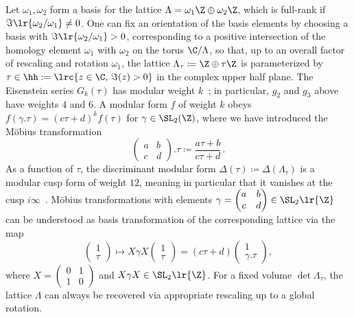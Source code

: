 \documentclass[a4paper, aps, pra, 11pt, onecolumn, tightenlines, superscriptaddress]{revtex4-2}
\begin{document}
Let $\omega_1, \omega_2$ form a basis for the lattice $\Lambda=\omega_1 \Z \oplus \omega_2\Z$, which is full-rank if $\Im\lr{\omega_2/\omega_1}\neq 0$. 
One can fix an orientation of the basis elements by choosing a basis with $\Im\lr{\omega_2/\omega_1} > 0$, corresponding to a positive intersection of the homology element $\omega_1$ with $\omega_2$ on the torus $\C /\Lambda$, so that, up to an overall factor of rescaling and rotation $\omega_1$, the lattice  $\Lambda_{\tau}\coloneqq \Z  \oplus \tau \Z$ is parameterized by $\tau \in \hh:=\lrc{ z\in\C,\, \Im(z)>0}$ in the complex upper half plane. 
The Eisenstein series $G_k(\tau)$ has modular weight $k$~\cite[Sec.~2.1]{Zagier2008}; in particular, $g_2$ and $g_3$ above have weights $4$ and $6$. A modular form $f$ of weight $k$ obeys $f(\gamma.\tau)=(c\tau+d)^k f(\tau)$ for $\gamma\in\SL_2(\Z)$, where we have introduced the Möbius transformation
\begin{equation}
    {\begin{pmatrix}
        a & b \\ c & d
    \end{pmatrix}
    }.\tau \coloneqq \frac{a\tau+b}{c\tau+d}\,.
\end{equation}
As a function of $\tau$, the discriminant modular form $\Delta(\tau)\coloneqq\Delta(\Lambda_{\tau})$ is a modular cusp form of weight $12$, meaning in particular that it vanishes at the cusp $i\infty$~\cite[Sec.~2.4]{Zagier2008}. 
Möbius transformations with elements $\gamma=\begin{pmatrix}
a & b \\ c & d
\end{pmatrix}\in \SL_2\lr{\Z}$ can be understood as basis transformation of the corresponding lattice via the map
\begin{equation}
\begin{pmatrix}
1 \\ \tau 
\end{pmatrix}
\mapsto
X\gamma X
\begin{pmatrix}
1 \\ \tau 
\end{pmatrix}
=
(c\tau+d)\begin{pmatrix}
1 \\ \gamma.\tau 
\end{pmatrix},
\end{equation}
where $X=\begin{pmatrix}
0 & 1 \\ 1 & 0
\end{pmatrix}$ and $X\gamma X \in \SL_2\lr{\Z}$. 
For a fixed volume $\det \Lambda_{\tau}$, the lattice $\Lambda$ can always be recovered via appropriate rescaling up to a global rotation.
\end{document}
